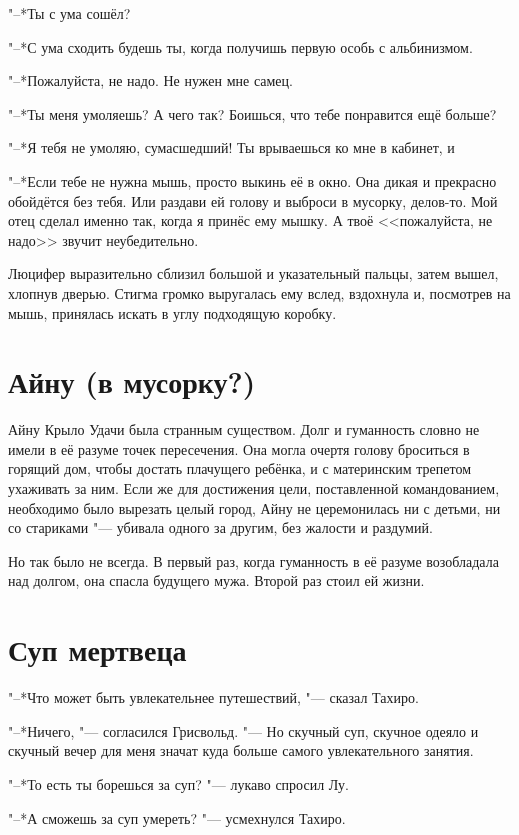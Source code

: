 "--*Ты с ума сошёл?

"--*С ума сходить будешь ты, когда получишь первую особь с альбинизмом.

"--*Пожалуйста, не надо.
Не нужен мне самец.

"--*Ты меня умоляешь?
А чего так?
Боишься, что тебе понравится ещё больше?

"--*Я тебя не умоляю, сумасшедший!
Ты врываешься ко мне в кабинет, и\ldotst

"--*Если тебе не нужна мышь, просто выкинь её в окно.
Она дикая и прекрасно обойдётся без тебя.
Или раздави ей голову и выброси в мусорку, делов-то.
Мой отец сделал именно так, когда я принёс ему мышку.
А твоё <<пожалуйста, не надо>> звучит неубедительно.

Люцифер выразительно сблизил большой и указательный пальцы, затем вышел, хлопнув дверью.
Стигма громко выругалась ему вслед, вздохнула и, посмотрев на мышь, принялась искать в углу подходящую коробку.

\section{Айну (в мусорку?)}

Айну Крыло Удачи была странным существом.
Долг и гуманность словно не имели в её разуме точек пересечения.
Она могла очертя голову броситься в горящий дом, чтобы достать плачущего ребёнка, и с материнским трепетом ухаживать за ним.
Если же для достижения цели, поставленной командованием, необходимо было вырезать целый город, Айну не церемонилась ни с детьми, ни со стариками "--- убивала одного за другим, без жалости и раздумий.

Но так было не всегда.
В первый раз, когда гуманность в её разуме возобладала над долгом, она спасла будущего мужа.
Второй раз стоил ей жизни.

\section{Суп мертвеца}

"--*Что может быть увлекательнее путешествий, "--- сказал Тахиро.

"--*Ничего, "--- согласился Грисвольд.
"--- Но скучный суп, скучное одеяло и скучный вечер для меня значат куда больше самого увлекательного занятия.

"--*То есть ты борешься за суп? "--- лукаво спросил Лу.

"--*А сможешь за суп умереть? "--- усмехнулся Тахиро.

